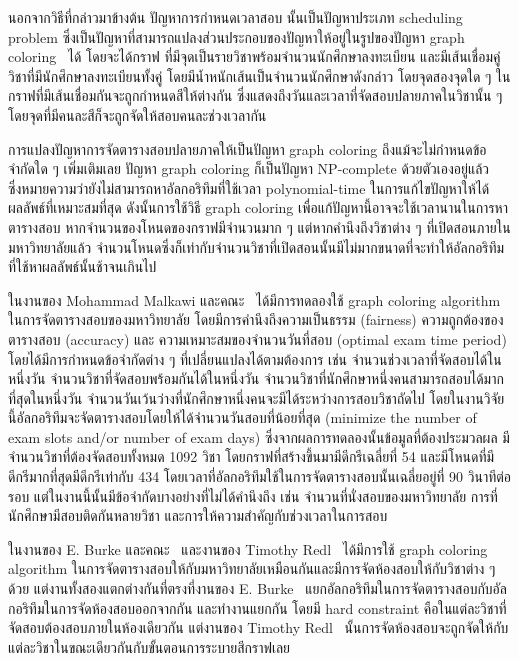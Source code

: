นอกจากวิธีที่กล่าวมาข้างต้น ปัญหาการกำหนดเวลาสอบ นั้นเป็นปัญหาประเภท scheduling problem 
ซึ่งเป็นปัญหาที่สามารถแปลงส่วนประกอบของปัญหาให้อยู่ในรูปของปัญหา graph coloring~\cite{mcs} ได้ 
โดยจะได้กราฟ ที่มีจุดเป็นรายวิชาพร้อมจำนวนนักศึกษาลงทะเบียน และมีเส้นเชื่อมคู่วิชาที่มีนักศึกษาลงทะเบียนทั้งคู่
โดยมีน้ำหนักเส้นเป็นจำนวนนักศึกษาดังกล่าว โดยจุดสองจุดใด ๆ ในกราฟที่มีเส้นเชื่อมกันจะถูกกำหนดสีให้ต่างกัน
ซึ่งแสดงถึงวันและเวลาที่จัดสอบปลายภาคในวิชานั้น ๆ โดยจุดที่มีคนละสีก็จะถูกจัดให้สอบคนละช่วงเวลากัน

การแปลงปัญหาการจัดตารางสอบปลายภาคให้เป็นปัญหา graph coloring ถึงแม้จะไม่กำหนดข้อจำกัดใด ๆ เพิ่มเติมเลย
ปัญหา graph coloring ก็เป็นปัญหา NP-complete ด้วยตัวเองอยู่แล้ว~\cite{alg-design} 
ซึ่งหมายความว่ายังไม่สามารถหาอัลกอริทึมที่ใช้เวลา polynomial-time ในการแก้ไขปัญหาให้ได้ผลลัพธ์ที่เหมาะสมที่สุด
ดังนั้นการใช้วิธี graph coloring เพื่อแก้ปัญหานี้อาจจะใช้เวลานานในการหาตารางสอบ หากจำนวนของโหนดของกราฟมีจำนวนมาก ๆ
แต่หากคำนึงถึงวิชาต่าง ๆ ที่เปิดสอนภายในมหาวิทยาลัยแล้ว จำนวนโหนดซึ่งก็เท่ากับจำนวนวิชาที่เปิดสอนนั้นมีไม่มากขนาดที่จะทำให้อัลกอริทึมที่ใช้หาผลลัพธ์นั้นช้าจนเกินไป

ในงานของ Mohammad Malkawi และคณะ~\cite{graphcl-2008}
ได้มีการทดลองใช้ graph coloring algorithm ในการจัดตารางสอบของมหาวิทยาลัย โดยมีการคำนึงถึงความเป็นธรรม (fairness) ความถูกต้องของตารางสอบ (accuracy) และ ความเหมาะสมของจำนวนวันที่สอบ (optimal exam time period)
โดยได้มีการกำหนดข้อจำกัดต่าง ๆ ที่เปลี่ยนแปลงได้ตามต้องการ เช่น จำนวนช่วงเวลาที่จัดสอบได้ในหนึ่งวัน จำนวนวิชาที่จัดสอบพร้อมกันได้ในหนึ่งวัน จำนวนวิชาที่นักศึกษาหนึ่งคนสามารถสอบได้มากที่สุดในหนึ่งวัน
จำนวนวันเว้นว่างที่นักศึกษาหนึ่งคนจะมีได้ระหว่างการสอบวิชาถัดไป โดยในงานวิจัยนี้อัลกอริทึมจะจัดตารางสอบโดยให้ได้จำนวนวันสอบที่น้อยที่สุด (minimize the number of exam
slots and/or number of exam days) ซึ่งจากผลการทดลองนั้นข้อมูลที่ต้องประมวลผล มีจำนวนวิชาที่ต้องจัดสอบทั้งหมด 1092 วิชา โดยกราฟที่สร้างขึ้นมามีดีกรีเฉลี่ยที่ 54 และมีโหนดที่มีดีกรีมากที่สุดมีดีกรีเท่ากับ 434
โดยเวลาที่อัลกอริทึมใช้ในการจัดตารางสอบนั้นเฉลี่ยอยู่ที่ 90 วินาทีต่อรอบ แต่ในงานนี้นั้นมีข้อจำกัดบางอย่างที่ไม่ได้คำนึงถึง เช่น จำนวนที่นั่งสอบของมหาวิทยาลัย การที่นักศึกษามีสอบติดกันหลายวิชา และการให้ความสำคัญกับช่วงเวลาในการสอบ

ในงานของ E. Burke และคณะ~\cite{graphcl-constr-manip} และงานของ Timothy Redl~\cite{graphcl-alter-approach}
ได้มีการใช้ graph coloring algorithm ในการจัดตารางสอบให้กับมหาวิทยาลัยเหมือนกันและมีการจัดห้องสอบให้กับวิชาต่าง ๆ ด้วย
แต่งานทั้งสองแตกต่างกันที่ตรงที่งานของ E. Burke~\cite{graphcl-constr-manip} แยกอัลกอริทึมในการจัดตารางสอบกับอัลกอริทึมในการจัดห้องสอบออกจากกัน
และทำงานแยกกัน โดยมี hard constraint คือในแต่ละวิชาที่จัดสอบต้องสอบภายในห้องเดียวกัน แต่งานของ Timothy Redl~\cite{graphcl-alter-approach}
นั้นการจัดห้องสอบจะถูกจัดให้กับแต่ละวิชาในขณะเดียวกันกับขั้นตอนการระบายสีกราฟเลย

